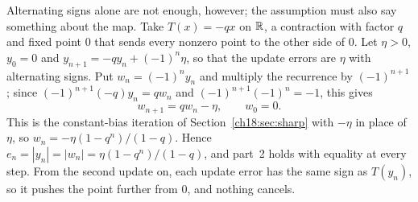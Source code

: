 Alternating signs alone are not enough, however; the assumption must also say something about the map. Take $T(x)=-qx$ on $\mathbb R$, a contraction with factor $q$ and fixed point $0$ that sends every nonzero point to the other side of $0$. Let $\eta>0$, $y_0=0$ and $y_{n+1}=-qy_n+(-1)^n\eta$, so that the update errors are $\eta$ with alternating signs. Put $w_n=(-1)^ny_n$ and multiply the recurrence by $(-1)^{n+1}$; since $(-1)^{n+1}(-q)y_n=qw_n$ and $(-1)^{n+1}(-1)^n=-1$, this gives
\[
 w_{n+1}=qw_n-\eta,\qquad w_0=0.
\]
This is the constant-bias iteration of Section~\ref{ch18:sec:sharp} with $-\eta$ in place of $\eta$, so $w_n=-\eta(1-q^n)/(1-q)$. Hence $e_n=|y_n|=|w_n|=\eta(1-q^n)/(1-q)$, and part~2 holds with equality at every step. From the second update on, each update error has the same sign as $T(y_n)$, so it pushes the point further from $0$, and nothing cancels.
